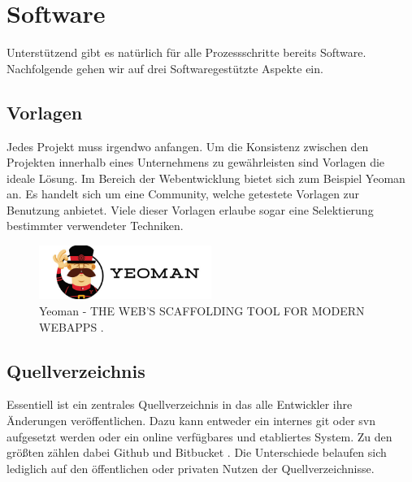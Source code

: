 \chapter{Software}
Unterstützend gibt es natürlich für alle Prozessschritte bereits Software. Nachfolgende gehen wir auf drei Softwaregestützte Aspekte ein.

\section{Vorlagen}
Jedes Projekt muss irgendwo anfangen. Um die Konsistenz zwischen den Projekten innerhalb eines Unternehmens zu gewährleisten sind Vorlagen die ideale Lösung. Im Bereich der Webentwicklung bietet sich zum Beispiel Yeoman \cite{yeoman} an. Es handelt sich um eine Community, welche getestete Vorlagen zur Benutzung anbietet. Viele dieser Vorlagen erlaube sogar eine Selektierung bestimmter verwendeter Techniken.

\begin{figure}[!htb]
	\centerline{\includegraphics[width=0.5\textwidth]{img/yeoman}}
	\caption{Yeoman - THE WEB'S SCAFFOLDING TOOL FOR MODERN WEBAPPS \cite{yeoman}.}
	\label{yeoman}
\end{figure}

\section{Quellverzeichnis}
Essentiell ist ein zentrales Quellverzeichnis in das alle Entwickler ihre Änderungen veröffentlichen. Dazu kann entweder ein internes git oder svn aufgesetzt werden oder ein online verfügbares und etabliertes System. Zu den größten zählen dabei Github \cite{github} und Bitbucket \cite{bitbucket}. Die Unterschiede belaufen sich lediglich auf den öffentlichen oder privaten Nutzen der Quellverzeichnisse.

